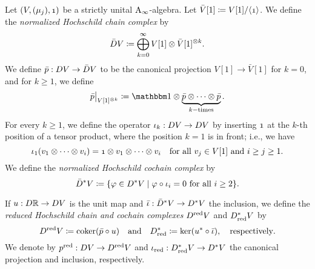 \documentclass[\MainFolder/Text.tex]{subfiles}
\begin{document}
\begin{Definition}\label{Def:NormRedHoch}
Let $(V,(\mu_j),\NOne)$ be a strictly unital $\mathrm{A}_\infty$-algebra. Let $\bar{V}[1]\coloneqq V[1]/\langle\NOne\rangle$. We define the \emph{normalized Hochschild chain complex} by
$$ \bar{D} V \coloneqq \bigoplus_{k=0}^\infty V[1]\otimes\bar{V}[1]^{\otimes k}. $$
We define $\bar{p}: D V \rightarrow \bar{D} V$ to be the canonical projection $V[1]\rightarrow \bar{V}[1]$ for $k=0$, and for $k\ge 1$, we define
$$ \Restr{\NormProj}{V[1]^{\otimes k}} \coloneqq \Id \otimes \underbrace{\NormProj \otimes \dotsb \otimes \NormProj}_{k-\text{times}}.$$
For every $k\ge 1$, we define the operator $\iota_k : D V \rightarrow D V$ by inserting $\NOne$ at the $k$-th position of a tensor product, where the position $k=1$ is in front; i.e., we have
$$ \InsOneOp_1(v_1\otimes\dotsb\otimes v_i) = \NOne\otimes v_1\otimes\dotsb\otimes v_i\quad\text{for all }v_j\in V[1]\text{ and }i\ge j\ge 1.$$
We define the \emph{normalized Hochschild cochain complex} by 
$$ \bar{D}^* V \coloneqq \{\varphi\in D^*V \mid \varphi \circ \iota_i = 0\text{ for all }i\ge 2\}. $$

If $u: D \mathbb{R} \rightarrow D V$ is the unit map and $\bar{\iota}: \bar{D}^*V \rightarrow D^* V$ the inclusion, we define the \emph{reduced Hochschild chain and cochain complexes} $D^{\mathrm{red}} V$ and $D_{\mathrm{red}}^* V$ by
$$ D^{\mathrm{red}} V \coloneqq \operatorname{\mathrm{coker}}(\bar{p}\circ u)\quad\text{and}\quad D_{\mathrm{red}}^*
 \coloneqq \ker(u^* \circ \bar{\iota}),\quad\text{respectively}.$$
We denote by $p^{\mathrm{red}}: D V \rightarrow D^{\mathrm{red}} V$ and $\iota_{\mathrm{red}}: D^*_{\mathrm{red}} V \rightarrow D^* V$ the canonical projection and inclusion, respectively.  
\end{Definition}
\end{document}
